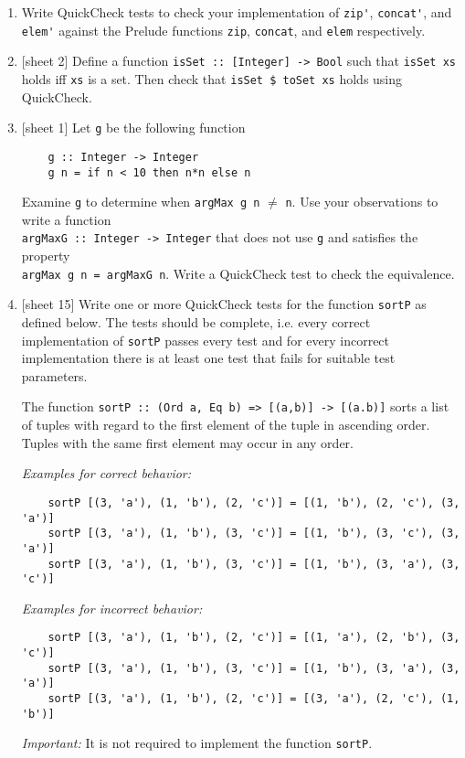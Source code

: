 \documentclass{article}
\begin{document}
\begin{enumerate}
\item Write QuickCheck tests to check your implementation of \verb|zip'|, \verb|concat'|, and \verb|elem'| against the Prelude functions \verb|zip|, \verb|concat|, and \verb|elem| respectively.

\item {[sheet 2]} Define a function \verb|isSet :: [Integer] -> Bool| such that \verb|isSet xs| holds iff \verb|xs| is a set. Then check that \verb|isSet $ toSet xs| holds using QuickCheck.

\item {[sheet 1]} Let \verb|g| be the following function
\begin{verbatim}
    g :: Integer -> Integer
    g n = if n < 10 then n*n else n
\end{verbatim}
Examine \verb|g| to determine when \verb|argMax g n| $\neq$ \verb|n|. Use your observations to write a function \\ \verb|argMaxG :: Integer -> Integer| that does not use \verb|g| and satisfies the property \\ \verb|argMax g n = argMaxG n|. Write a QuickCheck test to check the equivalence.

\item {[sheet 15]} Write one or more QuickCheck tests for the function \verb|sortP| as defined below. The tests should be complete, i.e. every correct implementation of \verb|sortP| passes every test and for every incorrect implementation there is at least one test that fails for suitable test parameters. \par
The function \verb|sortP :: (Ord a, Eq b) => [(a,b)] -> [(a.b)]| sorts a list of tuples with regard to the first element of the tuple in ascending order. Tuples with the same first element may occur in any order. \par
\textit{Examples for correct behavior:}
\begin{verbatim}
    sortP [(3, 'a'), (1, 'b'), (2, 'c')] = [(1, 'b'), (2, 'c'), (3, 'a')]
    sortP [(3, 'a'), (1, 'b'), (3, 'c')] = [(1, 'b'), (3, 'c'), (3, 'a')]
    sortP [(3, 'a'), (1, 'b'), (3, 'c')] = [(1, 'b'), (3, 'a'), (3, 'c')]
\end{verbatim}
\textit{Examples for incorrect behavior:}
\begin{verbatim}
    sortP [(3, 'a'), (1, 'b'), (2, 'c')] = [(1, 'a'), (2, 'b'), (3, 'c')]
    sortP [(3, 'a'), (1, 'b'), (3, 'c')] = [(1, 'b'), (3, 'a'), (3, 'a')]
    sortP [(3, 'a'), (1, 'b'), (2, 'c')] = [(3, 'a'), (2, 'c'), (1, 'b')]
\end{verbatim}
\textit{Important:} It is not required to implement the function \verb|sortP|.


\end{enumerate}
\end{document}
